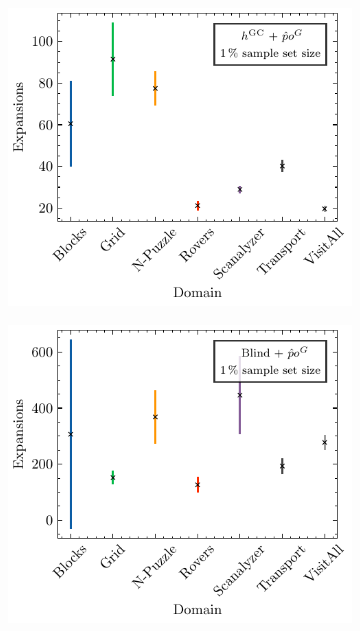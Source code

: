 \documentclass[ppgc,diss,english]{iiufrgs}
\begin{document}
\begin{figure}[tb]
  \vspace{0.5cm}

  \begin{subfigure}{0.41\textwidth}
    \centering
    \includegraphics[width=\linewidth]{img/error_hGC_poG_1pct.pdf}
  \end{subfigure}
  \begin{subfigure}{0.41\textwidth}
    \centering
    \includegraphics[width=\linewidth]{img/error_blind_poG_1pct.pdf}
  \end{subfigure}
  \label{fig:errors-logic}
\end{figure}
\end{document}
